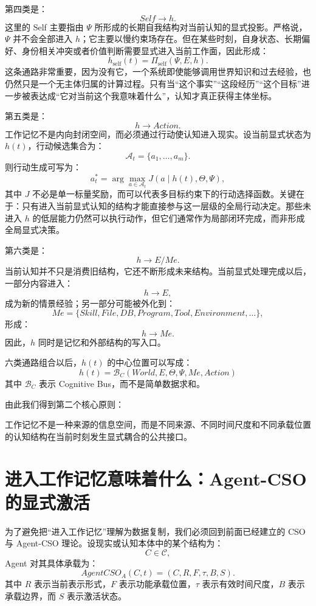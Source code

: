 第四类是：
\[
Self\rightarrow h.
\]
这里的 Self 主要指由 $\Psi$ 所形成的长期自我结构对当前认知的显式投影。严格说，$\Psi$ 并不会全部进入 $h$；它主要以慢约束场存在。但在某些时刻，自身状态、长期偏好、身份相关冲突或者价值判断需要显式进入当前工作面，因此形成：
\[
h_{\mathrm{self}}(t)
=
\Pi_{\mathrm{self}}
\left(
\Psi,E,h
\right).
\]
这条通路非常重要，因为没有它，一个系统即使能够调用世界知识和过去经验，也仍然只是一个无主体归属的计算过程。只有当“这个事实”“这段经历”“这个目标”进一步被表达成“它对当前这个我意味着什么”，认知才真正获得主体坐标。

第五类是：
\[
h\rightarrow Action.
\]
工作记忆不是内向封闭空间，而必须通过行动使认知进入现实。设当前显式状态为 $h(t)$，行动候选集合为：
\[
\mathcal A_t
=
\{a_1,\dots,a_m\}.
\]
则行动生成可写为：
\[
a_t^*
=
\arg\max_{a\in\mathcal A_t}
J(a\mid h(t),\Theta,\Psi),
\]
其中 $J$ 不必是单一标量奖励，而可以代表多目标约束下的行动选择函数。关键在于：只有进入当前显式认知的结构才能直接参与这一层级的全局行动决定。那些未进入 $h$ 的低层能力仍然可以执行动作，但它们通常作为局部闭环完成，而非形成全局显式决策。

第六类是：
\[
h\rightarrow E/Me.
\]
当前认知并不只是消费旧结构，它还不断形成未来结构。当前显式处理完成以后，一部分内容进入：
\[
h\rightarrow E,
\]
成为新的情景经验；另一部分可能被外化到：
\[
Me
=
\{
Skill,File,DB,Program,Tool,Environment,\ldots
\},
\]
形成：
\[
h\rightarrow Me.
\]
因此，$h$ 同时是记忆和外部结构的写入口。

六类通路组合以后，$h(t)$ 的中心位置可以写成：
\[
\boxed{
h(t)
=
\mathcal B_C
\left(
World,
E,
\Theta,
\Psi,
Me,
Action
\right)
}
\]
其中 $\mathcal B_C$ 表示 Cognitive Bus，而不是简单数据求和。

由此我们得到第二个核心原则：
\begin{proposition*}
工作记忆不是一种来源的信息空间，而是不同来源、不同时间尺度和不同承载位置的认知结构在当前时刻发生显式耦合的公共接口。
\end{proposition*}

\section{进入工作记忆意味着什么：Agent-CSO 的显式激活}

为了避免把“进入工作记忆”理解为数据复制，我们必须回到前面已经建立的 CSO 与 Agent-CSO 理论。设现实或认知本体中的某个结构为：
\[
C\in\mathcal C,
\]
Agent 对其具体承载为：
\[
AgentCSO_A(C,t)
=
(C,R,F,\tau,B,S).
\]
其中 $R$ 表示当前表示形式，$F$ 表示功能承载位置，$\tau$ 表示有效时间尺度，$B$ 表示承载边界，而 $S$ 表示激活状态。


